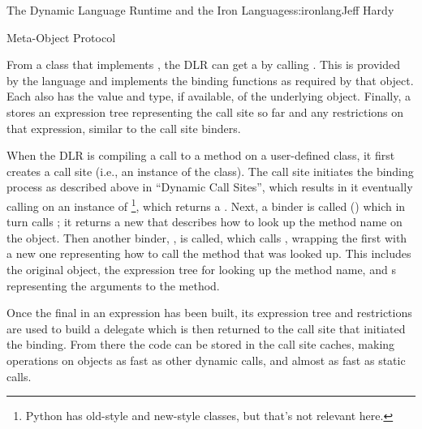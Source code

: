 \begin{aosachapter}{The Dynamic Language Runtime and the Iron Languages}{s:ironlang}{Jeff Hardy}
\begin{aosasect1}{Meta-Object Protocol}

From a class that implements , the DLR can get
a  by calling . This
 is provided by the language and implements the binding
functions as required by that object. Each  also has
the value and type, if available, of the underlying object. Finally, a
 stores an expression tree representing the call site
so far and any restrictions on that expression, similar to the call site
binders. 

When the DLR is compiling a call to a method on a user-defined class, it first
creates a call site (i.e., an instance of the  class). The call
site initiates the binding process as described above in ``Dynamic Call
Sites'', which results in it eventually calling  on an
instance of \footnote{Python has old-style and new-style
classes, but that's not relevant here.}, which returns a .
Next, a binder is called () which in turn
calls ; \linebreak
it returns a new  that describes how to look up 
the method name on \linebreak
the object. Then another binder, , is 
called, which calls \linebreak
{}, wrapping the first
 with a new one representing how to call the method
that was looked up. This includes the original object, the expression tree for
looking up the method name, and s representing the arguments to
the method.

Once the final  in an expression has been built, its
expression tree and restrictions are used to build a delegate which is then
returned to the call site that initiated the binding. From there the code can
be stored in the call site caches, making operations on objects as fast as
other dynamic calls, and almost as fast as static calls.


\end{aosasect1}
\end{aosachapter}
